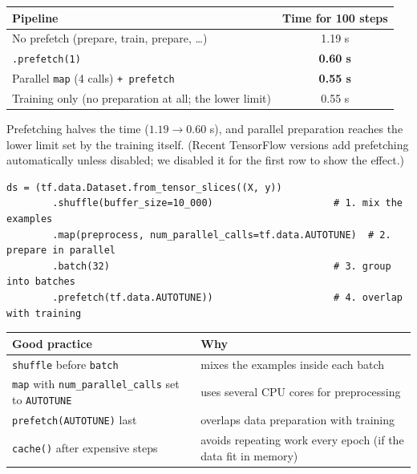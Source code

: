 \begin{center}
\begin{tabular}{@{}lc@{}}
\toprule
\textbf{Pipeline} & \textbf{Time for 100 steps}\\
\midrule
No prefetch (prepare, train, prepare, \dots) & 1.19 s\\
\texttt{.prefetch(1)} & \textbf{0.60 s}\\
Parallel \texttt{map} (4 calls) \texttt{+ prefetch} & \textbf{0.55 s}\\
Training only (no preparation at all; the lower limit) & 0.55 s\\
\bottomrule
\end{tabular}
\end{center}

\noindent Prefetching halves the time ($1.19\to0.60$ s), and parallel preparation reaches the lower limit set by the training itself. (Recent TensorFlow versions add prefetching automatically unless disabled; we disabled it for the first row to show the effect.)

\begin{lstlisting}
ds = (tf.data.Dataset.from_tensor_slices((X, y))
        .shuffle(buffer_size=10_000)                     # 1. mix the examples
        .map(preprocess, num_parallel_calls=tf.data.AUTOTUNE)  # 2. prepare in parallel
        .batch(32)                                       # 3. group into batches
        .prefetch(tf.data.AUTOTUNE))                     # 4. overlap with training
\end{lstlisting}

\begin{center}
\begin{tabular}{@{}p{6.6cm}p{6.8cm}@{}}
\toprule
\textbf{Good practice} & \textbf{Why}\\
\midrule
\texttt{shuffle} before \texttt{batch} & mixes the examples inside each batch\\
\texttt{map} with \texttt{num\_parallel\_calls} set to \texttt{AUTOTUNE} & uses several CPU cores for preprocessing\\
\texttt{prefetch(AUTOTUNE)} last & overlaps data preparation with training\\
\texttt{cache()} after expensive steps & avoids repeating work every epoch (if the data fit in memory)\\
\bottomrule
\end{tabular}
\end{center}

